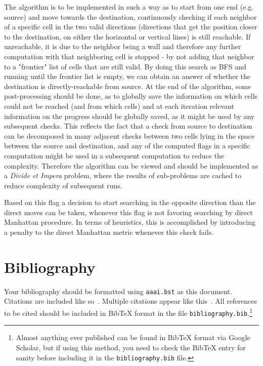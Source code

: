\documentclass[letterpaper]{article}
\begin{document}
The algorithm is to be implemented in such a way as to start from one end (e.g. source) and move towards the destination, continuously checking if each neighbor of a specific cell in the two valid directions (directions that get the position closer to the destination, on either the horizontal or vertical lines) is still reachable. If unreachable, it is due to the neighbor being a wall and therefore any further computation with that neighboring cell is stopped - by not adding that neighbor to a "frontier" list of cells that are still valid. By doing this search as BFS and running until the frontier list is empty, we can obtain an answer of whether the destination is directly-reachable from source. At the end of the algorithm, some post-processing should be done, as to globally save the information on which cells could not be reached (and from which cells) and at each iteration relevant information on the progress should be globally saved, as it might be used by any subsequent checks. This reflects the fact that a check from source to destination can be decomposed in many adjacent checks between two cells lying in the space between the source and destination, and any of the computed flags in a specific computation might be used in a subsequent computation to reduce the complexity. Therefore the algorithm can be viewed and should be implemented as a \textit{Divide et Impera} problem, where the results of sub-problems are cached to reduce complexity of subsequent runs.

Based on this flag a decision to start searching in the opposite direction than the direct moves can be taken, whenever this flag is not favoring searching by direct Manhattan procedure. In terms of heuristics, this is accomplished by introducing a penalty to the direct Manhattan metric whenever this check fails.

\section{Bibliography}
Your bibliography should be formatted using \texttt{aaai.bst} as this document. Citations are included like so~\cite{book2015}. Multiple citations appear like this~\cite{conf,article}. All references to be cited should be included in BibTeX format in the file \texttt{bibliography.bib}.\footnote{Almost anything ever published can be found in BibTeX format via Google Scholar, but if using this method, you need to check the BibTeX entry for sanity before including it in the \texttt{bibliography.bib} file.}
\end{document}
